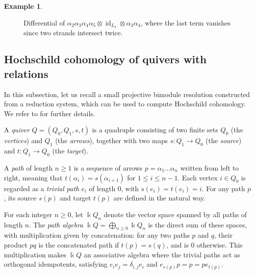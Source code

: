 \documentclass[a4paper, reqno, 11pt]{amsart}
\theoremstyle{definition}
\newtheorem{example}[theorem]{Example}
\newcommand{\opname}[1]{\operatorname{\mathsf{#1}}}
\newcommand{\Id}{\operatorname{id}}
\newcommand{\Sym}{\opname{Sym}}
\begin{document}
\begin{example}
\begin{figure}[htbp]
\begin{minipage}[c]{0.2\textwidth}
			\end{minipage}
			\hspace*{-0.5em}
			\caption{Differential of $\alpha_2 \alpha_3 \alpha_4 \alpha_5 \otimes \Id_{L_4} \otimes \alpha_3\alpha_4$, where the last term vanishes since  two strands intersect twice.}
			\label{fig: differential}
		\end{figure}
		
	\end{example}
	
	\subsection{Hochschild cohomology of quivers with relations} \label{subsection:reductionsystem} %
	In this subsection, let us recall a small projective bimodule resolution constructed from a reduction system, which can be used to compute Hochschild cohomology.  We refer to \cite{Chouhy-Solotar2015, Barmeier-Wang2020} for further details. 
	
	A \textit{quiver} $Q=(Q_0, Q_1, s, t)$ is a quadruple consisting of two finite sets $Q_0$ (the \textit{vertices}) and $Q_1$ (the \textit{arrows}), together with two maps $s: Q_1 \to Q_0$ (the \textit{source}) and $t: Q_1 \to Q_0$ (the \textit{target}). 
	
	A \textit{path} of length $n \ge 1$ is a sequence of arrows $p = \alpha_1 \dots \alpha_n$ written from left to right, meaning that $t(\alpha_i) = s(\alpha_{i+1})$ for $1 \le i \le n-1$. Each vertex $i \in Q_0$ is regarded as a \textit{trivial path} $e_i$ of length $0$, with $s(e_i) = t(e_i) = i$. For any path $p$, its source $s(p)$ and target $t(p)$ are defined in the natural way.
	
	For each integer $n \ge 0$, let $\Bbbk Q_n$ denote the vector space spanned by all paths of length $n$. The \textit{path algebra} $\Bbbk Q = \bigoplus\limits_{n \ge 0} \Bbbk Q_n$ is the direct sum of these spaces, with multiplication given by concatenation: for any two paths $p$ and $q$, their product $pq$ is the concatenated path if $t(p) = s(q)$, and is $0$ otherwise. This multiplication makes $\Bbbk Q$ an associative algebra where the trivial paths act as orthogonal idempotents, satisfying $e_i e_j = \delta_{i,j} e_i$ and $e_{s(p)} p = p = p e_{t(p)}$.
	
\end{document}
